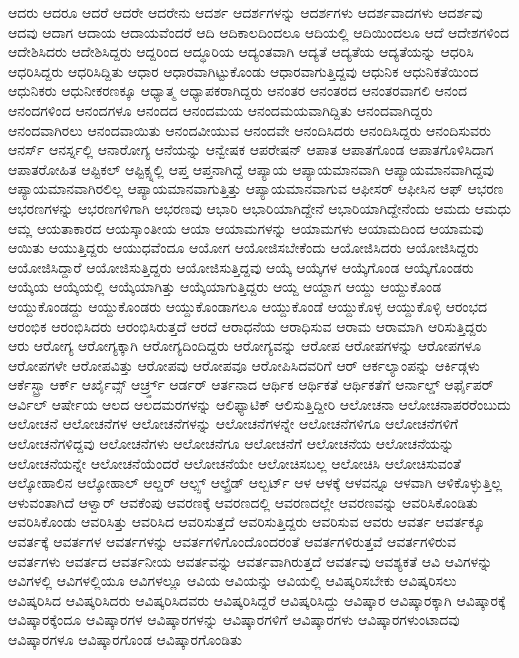 {ಆದರು
ಆದರೂ
ಆದರೆ
ಆದರೇ
ಆದರೇನು
ಆದರ್ಶ
ಆದರ್ಶಗಳನ್ನು
ಆದರ್ಶಗಳು
ಆದರ್ಶವಾದಗಳು
ಆದರ್ಶವು
ಆದವು
ಆದಾಗ
ಆದಾಯ
ಆದಾಯವೆಂದರೆ
ಆದಿ
ಆದಿಕಾಲದಿಂದಲೂ
ಆದಿಯಲ್ಲಿ
ಆದಿಯಿಂದಲೂ
ಆದೆ
ಆದೇಶಗಳಿಂದ
ಆದೇಶಿಸಿದರು
ಆದೇಶಿಸಿದ್ದರು
ಆದ್ದರಿಂದ
ಆದ್ಧೂರಿಯ
ಆದ್ಯಂತವಾಗಿ
ಆದ್ಯತೆ
ಆದ್ಯತೆಯ
ಆದ್ಯತೆಯನ್ನು
ಆಧರಿಸಿ
ಆಧರಿಸಿದ್ದರು
ಆಧರಿಸಿದ್ದಿತು
ಆಧಾರ
ಆಧಾರವಾಗಿಟ್ಟುಕೊಂಡು
ಆಧಾರವಾಗುತ್ತಿದ್ದವು
ಆಧುನಿಕ
ಆಧುನಿಕತೆಯಿಂದ
ಆಧುನಿಕರು
ಆಧುನೀಕರಣಕ್ಕೂ
ಆಧ್ಯಾತ್ಮ
ಆಧ್ಯಾಪಕರಾಗಿದ್ದರು
ಆನಂತರ
ಆನಂತರದ
ಆನಂತರವಾಗಲಿ
ಆನಂದ
ಆನಂದಗಳಿಂದ
ಆನಂದಗಳೂ
ಆನಂದದ
ಆನಂದಮಯ
ಆನಂದಮಯವಾಗಿದ್ದಿತು
ಆನಂದವಾಗಿದ್ದರು
ಆನಂದವಾಗಿರಲು
ಆನಂದವಾಯಿತು
ಆನಂದವೀಯುವ
ಆನಂದವೇ
ಆನಂದಿಸಿದರು
ಆನಂದಿಸಿದ್ದರು
ಆನಂದಿಸುವರು
ಆನರ್ಸ್
ಆನರ್ಸ್ನಲ್ಲಿ
ಆನಾರೋಗ್ಯ
ಆನೆಯನ್ನು
ಆನ್ವೇಷಕ
ಆಪರೇಷನ್
ಆಪಾತ
ಆಪಾತಗೊಂಡ
ಆಪಾತಗೊಳಿಸಿದಾಗ
ಆಪಾತರೋಹಿತ
ಆಪ್ಟಿಕಲ್
ಆಪ್ಟಿಕ್ಸ್ನಲ್ಲಿ
ಆಪ್ತ
ಆಪ್ತನಾಗಿದ್ದೆ
ಆಪ್ಯಾಯ
ಆಪ್ಯಾಯಮಾನವಾಗಿ
ಆಪ್ಯಾಯಮಾನವಾಗಿದ್ದವು
ಆಪ್ಯಾಯಮಾನವಾಗಿರಲಿಲ್ಲ
ಆಪ್ಯಾಯಮಾನವಾಗುತ್ತಿತ್ತು
ಆಪ್ಯಾಯಮಾನವಾಗುವ
ಆಫೀಸರ್
ಆಫೀಸಿನ
ಆಫ್
ಆಭರಣ
ಆಭರಣಗಳನ್ನು
ಆಭರಣಗಳಿಗಾಗಿ
ಆಭರಣವು
ಆಭಾರಿ
ಆಭಾರಿಯಾಗಿದ್ದೇನೆ
ಆಭಾರಿಯಾಗಿದ್ದೇನೆಂದು
ಆಮದು
ಆಮಧು
ಆಮ್ಲ
ಆಯತಾಕಾರದ
ಆಯಸ್ಕಾಂತೀಯ
ಆಯಾ
ಆಯಾಮಗಳನ್ನು
ಆಯಾಮಗಳು
ಆಯಾಮದಿಂದ
ಆಯಾಮವು
ಆಯಿತು
ಆಯುತ್ತಿದ್ದರು
ಆಯುಧವೆಂದೂ
ಆಯೋಗ
ಆಯೋಜಿಸಬೇಕೆಂದು
ಆಯೋಜಿಸಿದರು
ಆಯೋಜಿಸಿದ್ದರು
ಆಯೋಜಿಸಿದ್ದಾರೆ
ಆಯೋಜಿಸುತ್ತಿದ್ದರು
ಆಯೋಜಿಸುತ್ತಿದ್ದವು
ಆಯ್ಕೆ
ಆಯ್ಕೆಗಳ
ಆಯ್ಕೆಗೊಂಡ
ಆಯ್ಕೆಗೊಂಡರು
ಆಯ್ಕೆಯ
ಆಯ್ಕೆಯಲ್ಲಿ
ಆಯ್ಕೆಯಾಗಿತ್ತು
ಆಯ್ಕೆಯಾಗುತ್ತಿದ್ದರು
ಆಯ್ದ
ಆಯ್ದಾಗ
ಆಯ್ದು
ಆಯ್ದುಕೊಂಡ
ಆಯ್ದುಕೊಂಡದ್ದು
ಆಯ್ದುಕೊಂಡರು
ಆಯ್ದುಕೊಂಡಾಗಲೂ
ಆಯ್ದುಕೊಂಡೆ
ಆಯ್ದುಕೊಳ್ಳ
ಆಯ್ದುಕೊಳ್ಳಿ
ಆರಂಭದ
ಆರಂಭಿಕ
ಆರಂಭಿಸಿದರು
ಆರಂಭಿಸಿರುತ್ತದೆ
ಆರದೆ
ಆರಾಧನೆಯ
ಆರಾಧಿಸುವ
ಆರಾಮ
ಆರಾಮಾಗಿ
ಆರಿಸುತ್ತಿದ್ದರು
ಆರು
ಆರೋಗ್ಯ
ಆರೋಗ್ಯಕ್ಕಾಗಿ
ಆರೋಗ್ಯದಿಂದಿದ್ದರು
ಆರೋಗ್ಯವನ್ನು
ಆರೋಪ
ಆರೋಪಗಳನ್ನು
ಆರೋಪಗಳೂ
ಆರೋಪಗಳೇ
ಆರೋಪವಿತ್ತು
ಆರೋಪವು
ಆರೋಪವೂ
ಆರೋಪಿಸಿದವರಿಗೆ
ಆರ್
ಆರ್ಕಲ್ಯಾಂಪನ್ನು
ಆರ್ಕಿಡ್ಗಳು
ಆರ್ಕೆಸ್ಟ್ರಾ
ಆರ್ಕ್
ಆರ್ಖೈವ್ಸ್
ಆರ್ಚ್ರ್ಡ್
ಆರ್ಡರ್
ಆರ್ತನಾದ
ಆರ್ಥಿಕ
ಆರ್ಥಿಕತೆ
ಆರ್ಥಿಕತೆಗೆ
ಆರ್ನಾಲ್ಡ್
ಆರ್ಫೈಪರ್
ಆರ್ವಿಲ್
ಆರ್ಷೇಯ
ಆಲದ
ಆಲದಮರಗಳನ್ನು
ಆಲಿಫ್ಯಾಟಿಕ್
ಆಲಿಸುತ್ತಿದ್ದೀರಿ
ಆಲೋಚನಾ
ಆಲೋಚನಾಪರರೆಂಬುದು
ಆಲೋಚನೆ
ಆಲೋಚನೆಗಳ
ಆಲೋಚನೆಗಳನ್ನು
ಆಲೋಚನೆಗಳನ್ನೇ
ಆಲೋಚನೆಗಳಿಗೂ
ಆಲೋಚನೆಗಳಿಗೆ
ಆಲೋಚನೆಗಳಿದ್ದವು
ಆಲೋಚನೆಗಳು
ಆಲೋಚನೆಗೂ
ಆಲೋಚನೆಗೆ
ಆಲೋಚನೆಯ
ಆಲೋಚನೆಯನ್ನು
ಆಲೋಚನೆಯನ್ನೇ
ಆಲೋಚನೆಯೆಂದರೆ
ಆಲೋಚನೆಯೇ
ಆಲೋಚಿಸಬಲ್ಲ
ಆಲೋಚಿಸಿ
ಆಲೋಚಿಸುವಂತೆ
ಆಲ್ಕೋಹಾಲಿನ
ಆಲ್ಕೋಹಾಲ್
ಆಲ್ಡರ್
ಆಲ್ಪ್ಸ್
ಆಲ್ಫ್ರೆಡ್
ಆಲ್ಬರ್ಟ್
ಆಳ
ಆಳಕ್ಕೆ
ಆಳವನ್ನೂ
ಆಳವಾಗಿ
ಆಳಿಕೊಳ್ಳುತ್ತಿಲ್ಲ
ಆಳುವಂತಾಗಿದೆ
ಆಳ್ವಾರ್
ಆವಕೆಂಪು
ಆವರಣಕ್ಕೆ
ಆವರಣದಲ್ಲಿ
ಆವರಣದಲ್ಲೇ
ಆವರಣವನ್ನು
ಆವರಿಸಿಕೊಂಡಿತು
ಆವರಿಸಿಕೊಂಡು
ಆವರಿಸಿತ್ತು
ಆವರಿಸಿದ
ಆವರಿಸುತ್ತದೆ
ಆವರಿಸುತ್ತಿದ್ದರು
ಆವರಿಸುವ
ಆವರು
ಆವರ್ತ
ಆವರ್ತಕ್ಕೂ
ಆವರ್ತಕ್ಕೆ
ಆವರ್ತಗಳ
ಆವರ್ತಗಳನ್ನು
ಆವರ್ತಗಳಿಗೊಂದೊಂದರಂತೆ
ಆವರ್ತಗಳಿರುತ್ತವೆ
ಆವರ್ತಗಳಿರುವ
ಆವರ್ತಗಳು
ಆವರ್ತದ
ಆವರ್ತನೀಯ
ಆವರ್ತವನ್ನು
ಆವರ್ತವಾಗಿರುತ್ತದೆ
ಆವರ್ತವು
ಆವಶ್ಯಕತೆ
ಆವಿ
ಆವಿಗಳನ್ನು
ಆವಿಗಳಲ್ಲಿ
ಆವಿಗಳಲ್ಲಿಯೂ
ಆವಿಗಳಲ್ಲೂ
ಆವಿಯ
ಆವಿಯನ್ನು
ಆವಿಯಲ್ಲಿ
ಆವಿಷ್ಕರಿಸಬೇಕು
ಆವಿಷ್ಕರಿಸಲು
ಆವಿಷ್ಕರಿಸಿದ
ಆವಿಷ್ಕರಿಸಿದರು
ಆವಿಷ್ಕರಿಸಿದವರು
ಆವಿಷ್ಕರಿಸಿದ್ದರೆ
ಆವಿಷ್ಕರಿಸಿದ್ದು
ಆವಿಷ್ಕಾರ
ಆವಿಷ್ಕಾರಕ್ಕಾಗಿ
ಆವಿಷ್ಕಾರಕ್ಕೆ
ಆವಿಷ್ಕಾರಕ್ಕೆಂದೂ
ಆವಿಷ್ಕಾರಗಳ
ಆವಿಷ್ಕಾರಗಳನ್ನು
ಆವಿಷ್ಕಾರಗಳಿಗೆ
ಆವಿಷ್ಕಾರಗಳು
ಆವಿಷ್ಕಾರಗಳುಂಟಾದವು
ಆವಿಷ್ಕಾರಗಳೂ
ಆವಿಷ್ಕಾರಗೊಂಡ
ಆವಿಷ್ಕಾರಗೊಂಡಿತು
}
